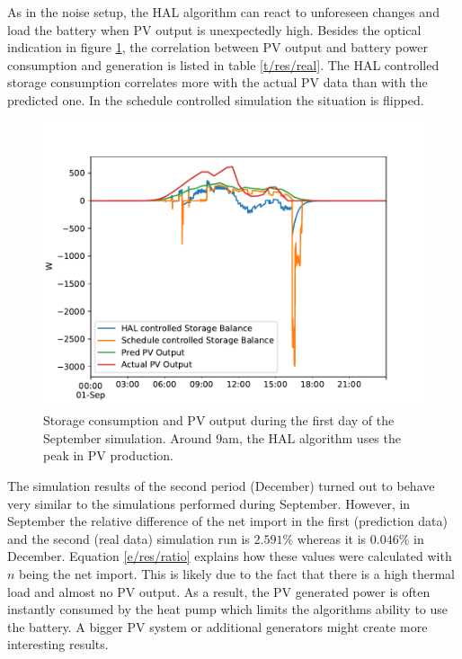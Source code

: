 \documentclass[a4paper,12pt]{book}
\theoremstyle{break}
\begin{document}
As in the noise setup, the HAL algorithm can react to unforeseen changes and load the battery when \ac{PV} output is unexpectedly high. Besides the optical indication in figure \ref{f/res/real/example}, the correlation between \ac{PV} output and battery power consumption and generation is listed in table \ref{t/res/real}. The HAL controlled storage consumption correlates more with the actual \ac{PV} data than with the predicted one. In the schedule controlled simulation the situation is flipped.



\begin{figure}[htp]
	\centering
	\includegraphics[width=\textwidth]{sept_real_example}
	\caption{Storage consumption and PV output during the first day of the September simulation. Around 9am, the HAL algorithm uses the peak in \ac{PV} production.}
	\label{f/res/real/example}
\end{figure}
\newpage
The simulation results of the second period (December) turned out to behave very similar to the simulations performed during September. However, in September the relative difference of the net import in the first (prediction data) and the second (real data) simulation run is $2.591\%$ whereas it is $0.046\%$ in December. Equation \ref{e/res/ratio} explains how these values were calculated with $n$ being the net import. This is likely due to the fact that there is a high thermal load and almost no \ac{PV} output. As a result, the \ac{PV} generated power is often instantly consumed by the heat pump which limits the algorithms ability to use the battery. A bigger \ac{PV} system or additional generators might create more interesting results.
\end{document}
